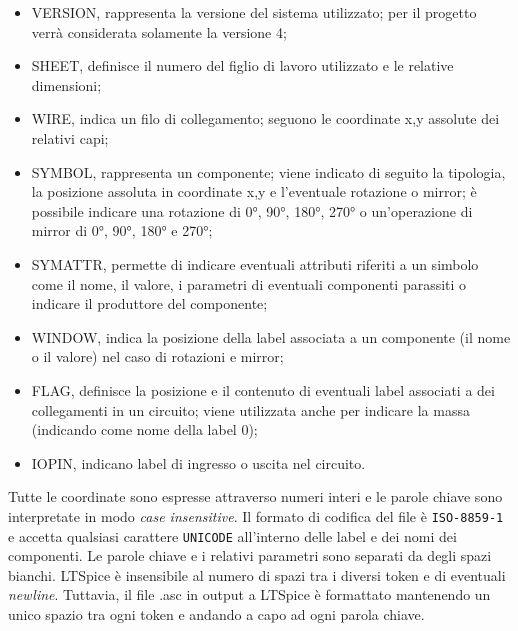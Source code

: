 \begin{itemize}
	\item VERSION, rappresenta la versione del sistema utilizzato; per il progetto verrà considerata solamente la versione 4;
	\item SHEET, definisce il numero del figlio di lavoro utilizzato e le relative dimensioni;
	\item WIRE, indica un filo di collegamento; seguono le coordinate x,y assolute dei relativi capi;
	\item SYMBOL, rappresenta un componente; viene indicato di seguito la tipologia, la posizione assoluta in coordinate x,y e l'eventuale rotazione o mirror; è possibile indicare una rotazione di 0°, 90°, 180°, 270° o un'operazione di mirror di 0°, 90°, 180° e 270°;
	\item SYMATTR, permette di indicare eventuali attributi riferiti a un simbolo come il nome, il valore, i parametri di eventuali componenti parassiti o indicare il produttore del componente;
	\item WINDOW, indica la posizione della label associata a un componente (il nome o il valore) nel caso di rotazioni e mirror;
	\item FLAG, definisce la posizione e il contenuto di eventuali label associati a dei collegamenti in un circuito; viene utilizzata anche per indicare la massa (indicando come nome della label 0);
	\item IOPIN, indicano label di ingresso o uscita nel circuito. 
\end{itemize}
Tutte le coordinate sono espresse attraverso numeri interi e le parole chiave sono interpretate in modo \textit{case insensitive}. Il formato di codifica del file è \texttt{ISO-8859-1} e accetta qualsiasi carattere \texttt{UNICODE} all'interno delle label e dei nomi dei componenti. Le parole chiave e i relativi parametri sono separati da degli spazi bianchi. LTSpice è insensibile al numero di spazi tra i diversi token e di eventuali \textit{newline}. Tuttavia, il file .asc in output a LTSpice è formattato mantenendo un unico spazio tra ogni token e andando a capo ad ogni parola chiave.


